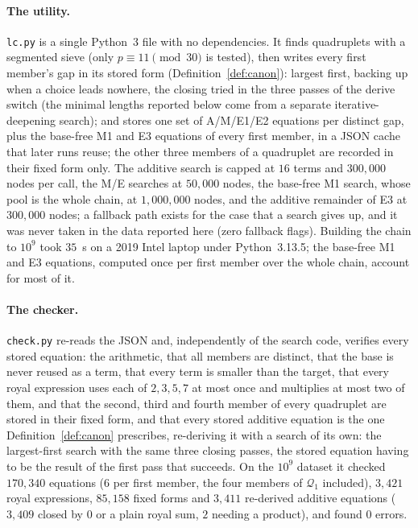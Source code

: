 \documentclass[11pt,a4paper]{article}
\newcommand{\Q}{\mathcal{Q}}
\newcommand{\code}[1]{\texttt{#1}}
\begin{document}
\paragraph{The utility.}
\code{lc.py} is a single Python~3 file with no dependencies. It finds
quadruplets with a segmented sieve (only $p\equiv11 \pmod{30}$ is tested),
then writes every first member's gap in its stored form
(Definition~\ref{def:canon}): largest first, backing up when a choice
leads nowhere, the closing tried in the three passes of the derive switch
(the minimal lengths reported below come from a separate
iterative-deepening search); and stores one set of A/M/E1/E2 equations
per
distinct gap, plus the base-free M1 and E3 equations of every first
member, in a JSON cache that later runs reuse; the other three members of
a quadruplet are recorded in their fixed form only. The additive search is
capped at $16$ terms and $300{,}000$ nodes per call, the M/E searches at
$50{,}000$ nodes, the base-free M1 search, whose pool is the whole chain,
at $1{,}000{,}000$ nodes, and the additive remainder of E3 at $300{,}000$
nodes; a fallback path exists for the case that a search gives up, and
it was never taken in the data reported here (zero fallback flags).
Building the chain to $10^9$ took $35$~s on a 2019 Intel laptop under
Python~3.13.5; the base-free M1 and E3 equations, computed once per first
member over the whole chain, account for most of it.

\paragraph{The checker.}
\code{check.py} re-reads the JSON and, independently of the search code,
verifies every stored equation: the arithmetic, that all members are
distinct, that the base is never reused as a term, that every term is
smaller than the target, that every royal expression uses each of
$2,3,5,7$ at most once and multiplies at most two of them, and that the
second, third and fourth member of every quadruplet are stored in their
fixed form, and that every stored additive equation is the one
Definition~\ref{def:canon} prescribes, re-deriving it with a search of its
own: the largest-first search with the same three closing passes, the
stored equation having to be the result of the first pass that succeeds.
On the $10^9$ dataset it
checked $170{,}340$ equations ($6$ per first member, the four members of
$\Q_1$ included), $3{,}421$ royal expressions, $85{,}158$ fixed forms and
$3{,}411$ re-derived additive equations ($3{,}409$ closed by $0$ or a
plain royal sum, $2$ needing a product), and found $0$ errors.
\end{document}
